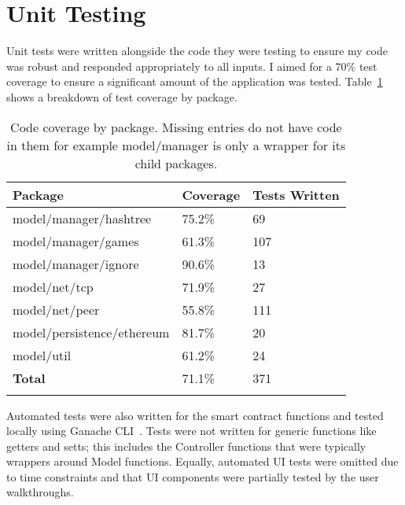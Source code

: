 \section{Unit Testing}

Unit tests were written alongside the code they were testing to ensure my code was robust and responded appropriately to all inputs. I aimed for a 70\% test coverage to ensure a significant amount of the application was tested. Table~\ref{tab:coverage} shows a breakdown of test coverage by package.

\begin{longtable}{p{} p{} p{}}
  \toprule
  \textbf{Package} & \textbf{Coverage} & \textbf{Tests Written}
  \\\midrule\midrule
  model/manager/hashtree
  & 75.2\%
  & 69
  \\
  model/manager/games
  & 61.3\%
  & 107
  \\
  model/manager/ignore
  & 90.6\%
  & 13
  \\
  model/net/tcp
  & 71.9\%
  & 27
  \\
  model/net/peer
  & 55.8\%
  & 111
  \\
  model/persistence/ethereum
  & 81.7\%
  & 20
  \\
  model/util
  & 61.2\%
  & 24
  \\\midrule\midrule
  \textbf{Total}
  & 71.1\%
  & 371
  \\\bottomrule\bottomrule
  \caption{Code coverage by package. Missing entries do not have code in them for example model/manager is only a wrapper for its child packages.}
  \label{tab:coverage}
\end{longtable}

\newparagraph
Automated tests were also written for the smart contract functions and tested locally using Ganache CLI~\cite{noauthor_trufflesuiteganache_2023}. 
Tests were not written for generic functions like getters and setts; this includes the Controller functions that were typically wrappers around Model functions. Equally, automated UI tests were omitted due to time constraints and that UI components were partially tested by the user walkthroughs.